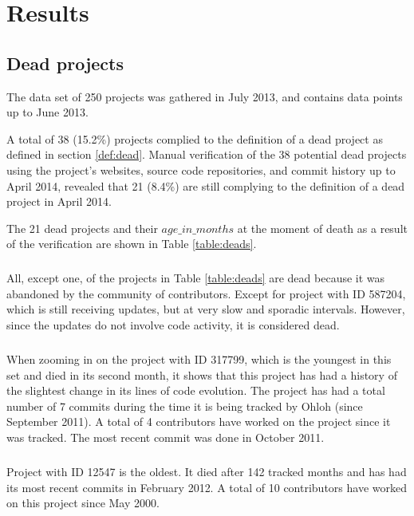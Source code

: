 \chapter{Results}
\label{results}

\section{Dead projects}
\label{section:deads}
The data set of 250 projects was gathered in July 2013, and contains data points
up to June 2013.

A total of 38 (15.2\%) projects complied to the definition of a dead project as
defined in section \ref{def:dead}. Manual verification of the 38 potential
dead projects using the project's websites, source code repositories, and
commit history up to April 2014, revealed that 21 (8.4\%) are still complying
to the definition of a dead project in April 2014.

The 21 dead projects and their $age\_in\_months$ at the moment of death as a
result of the verification are shown in Table \ref{table:deads}.



\paragraph{}
All, except one, of the projects in Table \ref{table:deads} are dead because it
was abandoned by the community of contributors. Except for project with ID
587204, which is still receiving updates, but at very slow and sporadic
intervals. However, since the updates do not involve code activity, it is
considered dead.

\paragraph{}
When zooming in on the project with ID 317799, which is the youngest in this set
and died in its second month, it shows that this project has had a history of
the slightest change in its lines of code evolution. The project has had a total
number of 7 commits during the time it is being tracked by Ohloh (since
September 2011). A total of 4 contributors have worked on the project since it
was tracked. The most recent commit was done in October 2011.

\paragraph{}
Project with ID 12547 is the oldest. It died after 142 tracked months and has
had its most recent commits in February 2012. A total of 10 contributors have
worked on this project since May 2000.

